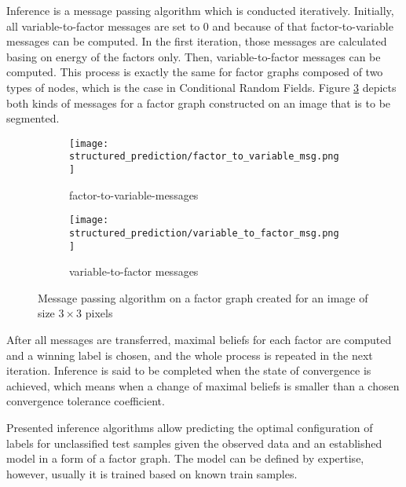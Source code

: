 Inference is a message passing algorithm which is conducted iteratively. Initially, all variable-to-factor messages are set to 0 and because of that factor-to-variable messages can be computed. In the first iteration, those messages are calculated basing on energy of the factors only. Then, variable-to-factor messages can be computed. This process is exactly the same for factor graphs composed of two types of nodes, which is the case in Conditional Random Fields. Figure \ref{fig:inference_msgs} depicts both kinds of messages for a factor graph constructed on an image that is to be segmented.
\begin{figure}[ht]
 \centering
   \begin{subfigure}[h]{0.40\textwidth}
    \texttt{[image: structured\_prediction/factor\_to\_variable\_msg.png]}
    \caption{factor-to-variable-messages}
    \label{fig:factor_variable_msg}
  \end{subfigure}
  \begin{subfigure}[h]{0.40\textwidth}
    \texttt{[image: structured\_prediction/variable\_to\_factor\_msg.png]}
    \caption{variable-to-factor messages}
    \label{fig:variable_factor_msg}
  \end{subfigure}
    \caption{Message passing algorithm on a factor graph created for an image of size $3\times 3$ pixels}
    \label{fig:inference_msgs}
\end{figure}
After all messages are transferred, maximal beliefs for each factor are computed and a winning label is chosen, and the whole process is repeated in the next iteration. Inference is said to be completed when the state of convergence is achieved, which means when a change of maximal beliefs is smaller than a chosen convergence tolerance coefficient.

Presented inference algorithms allow predicting the optimal configuration of labels for unclassified test samples given the observed data and an established model in a form of a factor graph. The model can be defined by expertise, however, usually it is trained based on known train samples.